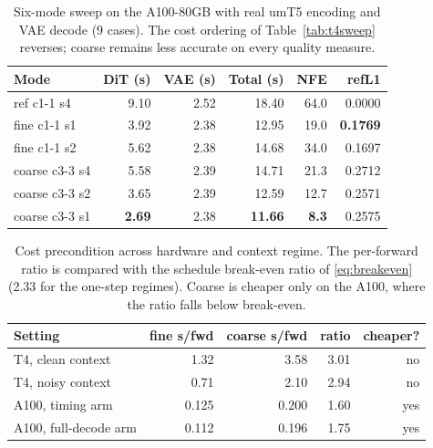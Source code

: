 \documentclass[journal]{IEEEtran}
\newcommand{\cfine}{\textup{c1-1}}
\newcommand{\ccoarse}{\textup{c3-3}}
\begin{document}
\begin{table}[!t]
\centering
\caption{Six-mode sweep on the A100-80GB with real umT5 encoding and VAE decode (9 cases). The cost ordering of Table~\ref{tab:t4sweep} reverses; coarse remains less accurate on every quality measure.}
\label{tab:a100sweep}
\renewcommand{\arraystretch}{1.12}
\footnotesize
\setlength{\tabcolsep}{3pt}
\begin{tabular}{@{}lrrrrr@{}}
\toprule
Mode & DiT (s) & VAE (s) & Total (s) & NFE & refL1 \\
\midrule
ref \cfine{} s4   & 9.10 & 2.52 & 18.40 & 64.0 & 0.0000 \\
fine \cfine{} s1  & 3.92 & 2.38 & 12.95 & 19.0 & \textbf{0.1769} \\
fine \cfine{} s2  & 5.62 & 2.38 & 14.68 & 34.0 & 0.1697 \\
coarse \ccoarse{} s4 & 5.58 & 2.39 & 14.71 & 21.3 & 0.2712 \\
coarse \ccoarse{} s2 & 3.65 & 2.39 & 12.59 & 12.7 & 0.2571 \\
coarse \ccoarse{} s1 & \textbf{2.69} & 2.38 & \textbf{11.66} & \textbf{8.3} & 0.2575 \\
\bottomrule
\end{tabular}
\end{table}

\begin{table}[!t]
\centering
\caption{Cost precondition across hardware and context regime. The per-forward ratio is compared with the schedule break-even ratio of \eqref{eq:breakeven} (2.33 for the one-step regimes). Coarse is cheaper only on the A100, where the ratio falls below break-even.}
\label{tab:costpre}
\renewcommand{\arraystretch}{1.12}
\footnotesize
\setlength{\tabcolsep}{4pt}
\begin{tabular}{@{}lrrrr@{}}
\toprule
Setting & fine s/fwd & coarse s/fwd & ratio & cheaper? \\
\midrule
T4, clean context      & 1.32  & 3.58  & 3.01 & no \\
T4, noisy context      & 0.71  & 2.10  & 2.94 & no \\
A100, timing arm       & 0.125 & 0.200 & 1.60 & yes \\
A100, full-decode arm  & 0.112 & 0.196 & 1.75 & yes \\
\bottomrule
\end{tabular}
\end{table}
\end{document}
